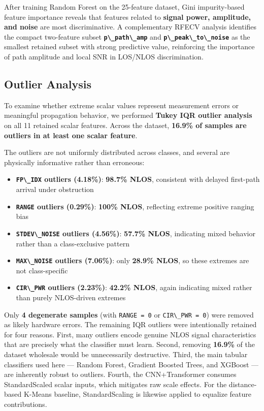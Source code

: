 \documentclass[12pt,a4paper]{article}
\newcommand{\passthrough}[1]{#1}
\providecommand{\passthrough}[1]{#1}
\providecommand{\tightlist}{%
  \setlength{\itemsep}{0pt}\setlength{\parskip}{0pt}}
\begin{document}
After training Random Forest on the 25-feature dataset, Gini
impurity-based feature importance reveals that features related to
\textbf{signal power, amplitude, and noise} are most discriminative. A
complementary RFECV analysis identifies the compact two-feature subset
\textbf{\passthrough{\lstinline!p\_path\_amp!}} and
\textbf{\passthrough{\lstinline!p\_peak\_to\_noise!}} as the smallest
retained subset with strong predictive value, reinforcing the importance
of path amplitude and local SNR in LOS/NLOS discrimination.

\subsection{Outlier Analysis}\label{outlier-analysis}

To examine whether extreme scalar values represent measurement errors or
meaningful propagation behavior, we performed \textbf{Tukey IQR outlier
analysis} on all 11 retained scalar features. Across the dataset,
\textbf{16.9\% of samples are outliers in at least one scalar feature}.

The outliers are not uniformly distributed across classes, and several
are physically informative rather than erroneous:

\begin{itemize}
\tightlist
\item
  \textbf{\passthrough{\lstinline!FP\_IDX!} outliers (4.18\%)}:
  \textbf{98.7\% NLOS}, consistent with delayed first-path arrival under
  obstruction
\item
  \textbf{\passthrough{\lstinline!RANGE!} outliers (0.29\%)}:
  \textbf{100\% NLOS}, reflecting extreme positive ranging bias
\item
  \textbf{\passthrough{\lstinline!STDEV\_NOISE!} outliers (4.56\%)}:
  \textbf{57.7\% NLOS}, indicating mixed behavior rather than a
  class-exclusive pattern
\item
  \textbf{\passthrough{\lstinline!MAX\_NOISE!} outliers (7.06\%)}: only
  \textbf{28.9\% NLOS}, so these extremes are not class-specific
\item
  \textbf{\passthrough{\lstinline!CIR\_PWR!} outliers (2.23\%)}:
  \textbf{42.2\% NLOS}, again indicating mixed rather than purely
  NLOS-driven extremes
\end{itemize}

Only \textbf{4 degenerate samples} (with
\passthrough{\lstinline!RANGE = 0!} or
\passthrough{\lstinline!CIR\_PWR = 0!}) were removed as likely hardware
errors. The remaining IQR outliers were intentionally retained for four
reasons. First, many outliers encode genuine NLOS signal characteristics
that are precisely what the classifier must learn. Second, removing
\textbf{16.9\%} of the dataset wholesale would be unnecessarily
destructive. Third, the main tabular classifiers used here --- Random
Forest, Gradient Boosted Trees, and XGBoost --- are inherently robust to
outliers. Fourth, the CNN+Transformer consumes StandardScaled scalar
inputs, which mitigates raw scale effects. For the distance-based
K-Means baseline, StandardScaling is likewise applied to equalize
feature contributions.
\end{document}
